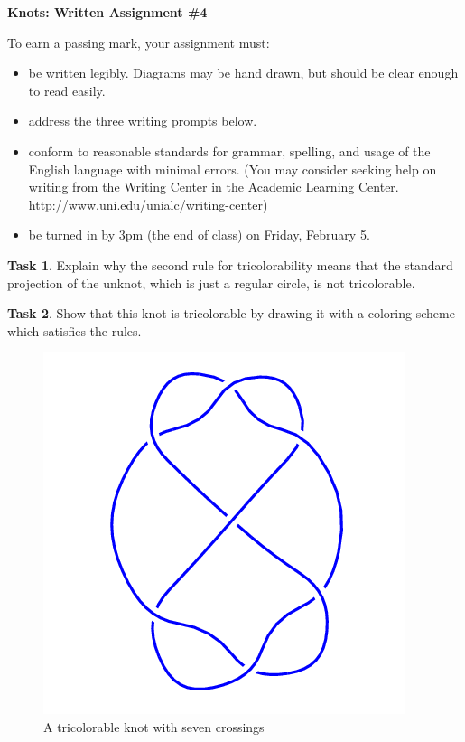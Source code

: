 \documentclass[12pt,letterpaper]{article}
\theoremstyle{definition}
\newtheorem{task}{Task}
\begin{document}
\setlength{\parskip}{1ex plus 0.5ex minus 0.2ex}
\setlength{\parindent}{0pt}

\pagestyle{fancy}
\lfoot{}
\rfoot{}

\begin{center}
{
\Large
\textbf{Knots: Written Assignment \#4}
}
\end{center}

To earn a passing mark, your assignment must:
\begin{itemize}
\item be written legibly. Diagrams may be hand drawn, but should be clear enough to read easily.
\item address the three writing prompts below.
\item conform to reasonable standards for grammar, spelling, and usage of the English language with minimal errors. (You may consider seeking help on writing from the Writing Center in the Academic Learning Center. http://www.uni.edu/unialc/writing-center)
\item be turned in by 3pm (the end of class) on Friday, February 5.
\end{itemize}




\begin{task}
Explain why the second rule for tricolorability means that the standard projection of the unknot, which is just a regular circle, is not tricolorable.
\end{task}

\begin{task}
Show that this knot is tricolorable by drawing it with a coloring scheme which satisfies the rules.
\begin{figure}[h]
\centering
\includegraphics[width=.25\textwidth]{knotpics/7_4.png}
\caption{A tricolorable knot with seven crossings}
\end{figure}
\end{task}

\end{document}
